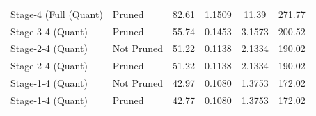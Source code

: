 \begin{table}
\begin{tabular}{llcccc}
Stage-4 (Full
(Quant) & Pruned & 82.61 & 1.1509 & 11.39 & 271.77 \\
Stage-3-4
(Quant) & Pruned & 55.74 & 0.1453 & 3.1573 & 200.52 \\
Stage-2-4
(Quant) & Not Pruned & 51.22 & 0.1138 & 2.1334 & 190.02 \\
Stage-2-4
(Quant) & Pruned & 51.22 & 0.1138 & 2.1334 & 190.02 \\
Stage-1-4
(Quant) & Not Pruned & 42.97 & 0.1080 & 1.3753 & 172.02 \\
Stage-1-4
(Quant) & Pruned & 42.77 & 0.1080 & 1.3753 & 172.02 \\
\bottomrule
\end{tabular}
\end{table}
